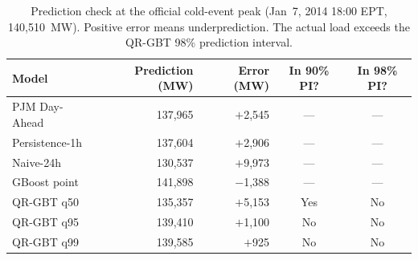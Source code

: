 
\begin{table}[htbp]
\centering
\caption{Prediction check at the official cold-event peak (Jan~7, 2014 18:00 EPT, 140,510~MW). Positive error means underprediction. The actual load exceeds the QR-GBT 98\% prediction interval.}
\label{tab:event_peak}
\begin{tabular}{lrrcc}
\toprule
Model & Prediction (MW) & Error (MW) & In 90\% PI? & In 98\% PI? \\
\midrule
PJM Day-Ahead & 137,965 & $+$2,545 & — & — \\
Persistence-1h & 137,604 & $+$2,906 & — & — \\
Naive-24h & 130,537 & $+$9,973 & — & — \\
GBoost point & 141,898 & $-$1,388 & — & — \\
QR-GBT q50 & 135,357 & $+$5,153 & Yes & No \\
QR-GBT q95 & 139,410 & $+$1,100 & No & No \\
QR-GBT q99 & 139,585 & $+$925 & No & No \\
\bottomrule
\end{tabular}
\end{table}
